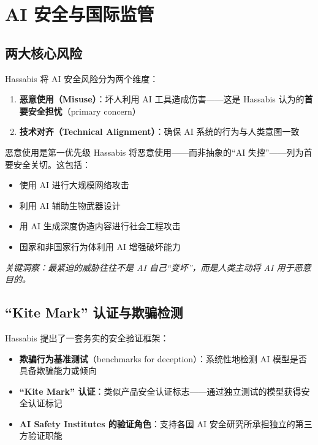 \section{AI 安全与国际监管}

\subsection{两大核心风险}

Hassabis 将 AI 安全风险分为两个维度：

\begin{enumerate}
    \item \textbf{恶意使用（Misuse）}：坏人利用 AI 工具造成伤害——这是 Hassabis 认为的\textbf{首要安全担忧}（primary concern）
    \item \textbf{技术对齐（Technical Alignment）}：确保 AI 系统的行为与人类意图一致
\end{enumerate}

\begin{importantbox}{恶意使用是第一优先级}
Hassabis 将恶意使用——而非抽象的``AI 失控''——列为首要安全关切。这包括：
\begin{itemize}
    \item 使用 AI 进行大规模网络攻击
    \item 利用 AI 辅助生物武器设计
    \item 用 AI 生成深度伪造内容进行社会工程攻击
    \item 国家和非国家行为体利用 AI 增强破坏能力
\end{itemize}
\textit{关键洞察：最紧迫的威胁往往不是 AI 自己``变坏''，而是人类主动将 AI 用于恶意目的。}
\end{importantbox}

\subsection{``Kite Mark'' 认证与欺骗检测}

Hassabis 提出了一套务实的安全验证框架：

\begin{itemize}
    \item \textbf{欺骗行为基准测试}（benchmarks for deception）：系统性地检测 AI 模型是否具备欺骗能力或倾向
    \item \textbf{``Kite Mark'' 认证}：类似产品安全认证标志——通过独立测试的模型获得安全认证标记
    \item \textbf{AI Safety Institutes 的验证角色}：支持各国 AI 安全研究所承担独立的第三方验证职能
\end{itemize}


